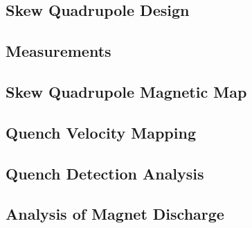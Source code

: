 \documentclass{article}
\begin{document}
\subsection{Skew Quadrupole Design}


\subsection{Measurements}


\subsection{Skew Quadrupole Magnetic Map}

\subsection{Quench Velocity Mapping}

\subsection{Quench Detection Analysis}
% 

\subsection{Analysis of Magnet Discharge}
% 
\end{document}
